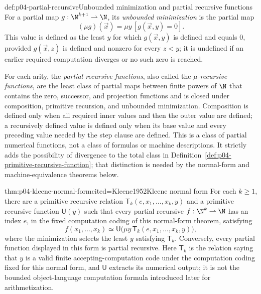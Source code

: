 \begin{hbdefinition}{def:p04-partial-recursive}{Unbounded minimization and partial recursive functions}
For a partial map \(g:\N^{k+1}\rightharpoonup\N\), its \emph{unbounded
minimization} is the partial map
\[
  (\mu g)(\vec x)=\mu y\,[g(\vec x,y)=0].
\]
This value is defined as the least \(y\) for which \(g(\vec x,y)\) is defined
and equals \(0\), provided \(g(\vec x,z)\) is defined and nonzero for every
\(z<y\); it is undefined if an earlier required computation diverges or no
such zero is reached.

For each arity, the \emph{partial recursive functions}, also called the
\emph{\(\mu\)-recursive functions}, are the least class of
partial maps between finite powers of \(\N\) that contains the zero,
successor, and projection functions and is closed under composition, primitive
recursion, and unbounded minimization.  Composition is defined only when all
required inner values and then the outer value are defined; a recursively
defined value is defined only when its base value and every preceding value
needed by the step clause are defined.  This is a class of partial numerical
functions, not a class of formulas or machine descriptions.  It strictly adds
the possibility of divergence to the total class in
Definition~\ref{def:p04-primitive-recursive-function}; that distinction is
needed by the normal-form and machine-equivalence theorems below.
\end{hbdefinition}

\begin{hbtheorem}{thm:p04-kleene-normal-form}{cited=Kleene1952}{Kleene normal form}
For each \(k\ge1\), there are a primitive recursive relation
\(\mathsf T_k(e,x_1,\ldots,x_k,y)\) and a primitive recursive function
\(\mathsf U(y)\) such that every partial recursive
\(f:\N^k\rightharpoonup\N\) has an index \(e\), in the fixed computation
coding of this normal-form theorem, satisfying
\[
  f(x_1,\ldots,x_k)
  \simeq
  \mathsf U\bigl(\mu y\,
    \mathsf T_k(e,x_1,\ldots,x_k,y)\bigr),
\]
where the minimization selects the least \(y\) satisfying \(\mathsf T_k\).
Conversely, every partial function displayed in this form is partial
recursive.  Here \(\mathsf T_k\) is the relation saying that \(y\) is a valid
finite accepting-computation code under the computation coding fixed for this
normal form, and \(\mathsf U\) extracts its numerical output; it is not the
bounded object-language computation formula introduced later for
arithmetization.
\end{hbtheorem}

